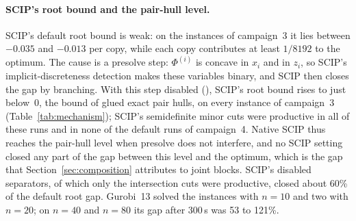 \paragraph{SCIP's root bound and the pair-hull level.} SCIP's default root
bound is weak: on the instances of campaign~3 it lies between $-0.035$ and
$-0.013$ per copy, while each copy contributes at least $1/8192$ to the optimum. The
cause is a presolve step: $\Phi^{(i)}$ is concave in $x_i$ and in $z_i$, so
SCIP's implicit-discreteness detection \citep[Section~4.2.7]{SCIP8report} makes
these variables binary, and SCIP then closes the gap by branching. With this
step disabled (), SCIP's root bound
rises to just below~0, the bound of glued exact pair hulls, on every instance
of campaign~3 (Table~\ref{tab:mechanism}); SCIP's semidefinite minor cuts were
productive in all of these runs and in none of the default runs of campaign~4. Native SCIP thus reaches the
pair-hull level when presolve does not interfere, and no SCIP setting closed
any part of the gap between this level and the optimum, which is the gap that
Section~\ref{sec:composition} attributes to joint blocks. SCIP's disabled
separators, of which only the intersection cuts were productive, closed about
60\% of the default root gap. Gurobi~13 solved the instances with $n=10$ and
two with $n=20$; on $n=40$ and $n=80$ its gap after 300\,s was 53 to 121\%.

